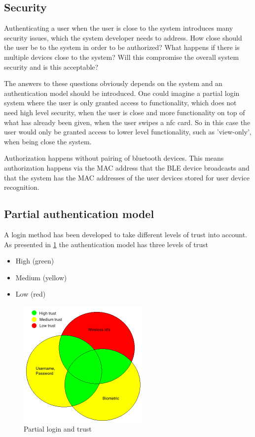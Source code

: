 \subsection{Security}

Authenticating a user when the user is close to the system introduces many security issues, which the system developer needs to address.
How close should the user be to the system in order to be authorized? What happens if there is multiple devices close to the system? Will this compromise the overall system security and is this acceptable?

The answers to these questions obviously depends on the system and an authentication model should be introduced.
One could imagine a partial login system where the user is only granted access to functionality, which does not need high level security, when the user is close and more functionality on top of what has already been given, when the user swipes a nfc card.
So in this case the user would only be granted access to lower level functionality, such as 'view-only', when being close the system.

Authorization happens without pairing of bluetooth devices.
This means authorization happens via the MAC address that the BLE device broadcasts and that the system has the MAC addresses of the user devices stored for user device recognition.



\subsection{Partial authentication model}
A login method has been developed to take different levels of trust into account.
As presented in \cref{fig_authentication_model} the authentication model has three levels of trust
\begin{itemize}
\item High (green)
\item Medium (yellow)
\item Low (red)
\end{itemize}

\begin{figure}[!t]
	\centering
	\includegraphics[width=2.5in]{img/authenticationModel}
	\caption{ Partial login and trust }
	\label{fig_authentication_model}
\end{figure}

